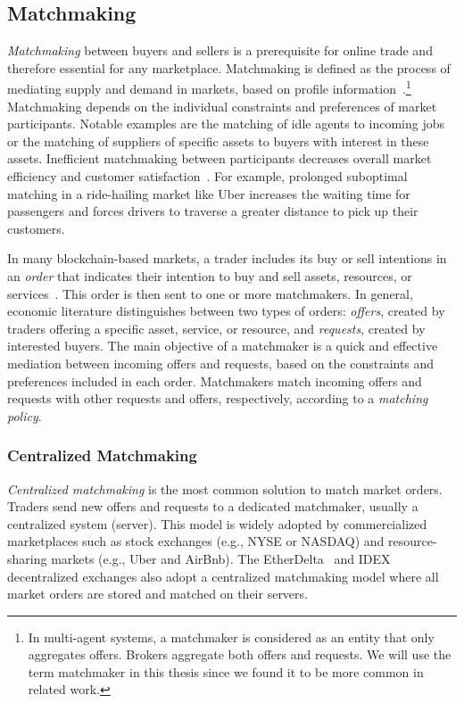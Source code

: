 \subsection{Matchmaking}
\label{sec:matchmaking}
\emph{Matchmaking} between buyers and sellers is a prerequisite for online trade and therefore essential for any marketplace.
Matchmaking is defined as the process of mediating supply and demand in markets, based on profile information~\cite{veit2003matchmaking}.\footnote{In multi-agent systems, a matchmaker is considered as an entity that only aggregates offers. Brokers aggregate both offers and requests. We will use the term matchmaker in this thesis since we found it to be more common in related work.}
Matchmaking depends on the individual constraints and preferences of market participants.
Notable examples are the matching of idle agents to incoming jobs or the matching of suppliers of specific assets to buyers with interest in these assets.
Inefficient matchmaking between participants decreases overall market efficiency and customer satisfaction~\cite{Wu2015TheM}.
For example, prolonged suboptimal matching in a ride-hailing market like Uber increases the waiting time for passengers and forces drivers to traverse a greater distance to pick up their customers.

In many blockchain-based markets, a trader includes its buy or sell intentions in an \emph{order} that indicates their intention to buy and sell assets, resources, or services~\cite{veit2003matchmaking}.
This order is then sent to one or more matchmakers.
In general, economic literature distinguishes between two types of orders: \emph{offers}, created by traders offering a specific asset, service, or resource, and \emph{requests}, created by interested buyers.
The main objective of a matchmaker is a quick and effective mediation between incoming offers and requests, based on the constraints and preferences included in each order.
Matchmakers match incoming offers and requests with other requests and offers, respectively, according to a \emph{matching policy}.

\subsubsection{Centralized Matchmaking}
\emph{Centralized matchmaking} is the most common solution to match market orders.
Traders send new offers and requests to a dedicated matchmaker, usually a centralized system (server).
This model is widely adopted by commercialized marketplaces such as stock exchanges (e.g., NYSE or NASDAQ) and resource-sharing markets (e.g., Uber and AirBnb).
The EtherDelta~\cite{etherdelta} and IDEX~\cite{idex} decentralized exchanges also adopt a centralized matchmaking model where all market orders are stored and matched on their servers.

